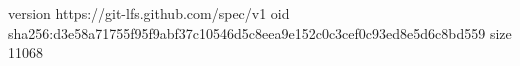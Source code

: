 version https://git-lfs.github.com/spec/v1
oid sha256:d3e58a71755f95f9abf37c10546d5c8eea9e152c0c3cef0c93ed8e5d6c8bd559
size 11068
